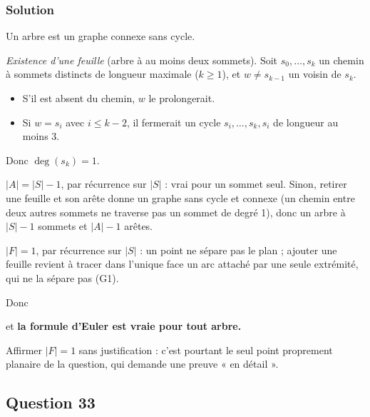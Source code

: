 \documentclass[11pt,a4paper]{article}
\providecommand{\tightlist}{\setlength{\itemsep}{0pt}\setlength{\parskip}{0pt}}
\newcommand{\equationajustee}[1]{%
  \sbox{\boiteequation}{$\displaystyle #1$}%
  \ifdim\wd\boiteequation>\linewidth
    \[\resizebox{\linewidth}{!}{\usebox{\boiteequation}}\]%
  \else
    \[#1\]%
  \fi}
\begin{document}
\hypertarget{solution-31}{%
\subsubsection{Solution}\label{solution-31}}

Un arbre est un graphe connexe sans cycle.

\emph{Existence d'une feuille} (arbre à au moins deux sommets). Soit \(s_0, \dots, s_k\) un chemin à sommets distincts de longueur maximale (\(k \ge 1\)), et \(w \neq s_{k-1}\) un voisin de \(s_k\).

\begin{itemize}
\tightlist
\item
  S'il est absent du chemin, \(w\) le prolongerait.
\item
  Si \(w = s_i\) avec \(i \le k-2\), il fermerait un cycle \(s_i, \dots, s_k, s_i\) de longueur au moins 3.
\end{itemize}

Donc \(\deg(s_k) = 1\).

\emph{\(|A| = |S| - 1\)}, par récurrence sur \(|S|\) : vrai pour un sommet seul. Sinon, retirer une feuille et son arête donne un graphe sans cycle et connexe (un chemin entre deux autres sommets ne traverse pas un sommet de degré 1), donc un arbre à \(|S| - 1\) sommets et \(|A| - 1\) arêtes.

\emph{\(|F| = 1\)}, par récurrence sur \(|S|\) : un point ne sépare pas le plan ; ajouter une feuille revient à tracer dans l'unique face un arc attaché par une seule extrémité, qui ne la sépare pas (G1).

Donc

\equationajustee{\begin{aligned}
|S| - |A| + |F| &= |S| - (|S| - 1) + 1 \\
&= 2,
\end{aligned}}

et \textbf{la formule d'Euler est vraie pour tout arbre.}

\begin{piege}

Affirmer \(|F| = 1\) sans justification : c'est pourtant le seul point proprement planaire de la question, qui demande une preuve « en détail ».

\end{piege}

\hypertarget{question-33}{%
\subsection{Question 33}\label{question-33}}
\end{document}
